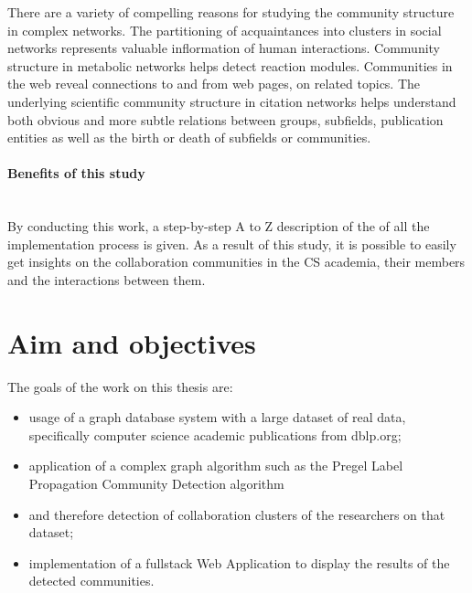 There are a variety of compelling reasons for studying the community structure in complex networks.
The partitioning of acquaintances into clusters in social networks represents valuable inflormation of human interactions.
Community structure in metabolic networks helps detect reaction modules.
Communities in the web reveal connections to and from web pages, on related topics.
The underlying scientific community structure in citation networks helps understand both obvious and more subtle relations between groups, subfields, publication entities as well as
the birth or death of subfields or communities.

\paragraph{Benefits of this study}\mbox{}\\\indent
By conducting this work, a step-by-step A to Z description of the of all the implementation process is given.
As a result of this study, it is possible to easily get insights on the collaboration communities in the CS academia, their members and the interactions between them.
\par

\section{Aim and objectives} \label{section:Introduction/Aimandobjectives}
The goals of the work on this thesis are:
 \begin{itemize}[noitemsep]
	\item usage of a graph database system with a large dataset of real data, specifically computer science academic publications from \gls{dblp.org};
	\item application of a complex graph algorithm such as the \gls{Pregel} \gls{Label Propagation} Community Detection algorithm
	\item and therefore detection of collaboration clusters of the researchers on that dataset;
	\item implementation of a fullstack \gls{Web Application} to display the results of the detected communities.
\end{itemize}

